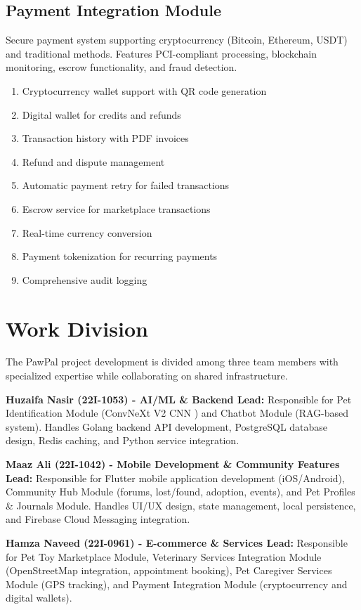 \subsection{Payment Integration Module}

Secure payment system supporting cryptocurrency (Bitcoin, Ethereum, USDT) and traditional methods. Features PCI-compliant processing, blockchain monitoring, escrow functionality, and fraud detection.

\begin{enumerate}
    \item Cryptocurrency wallet support with QR code generation
    \item Digital wallet for credits and refunds
    \item Transaction history with PDF invoices
    \item Refund and dispute management
    \item Automatic payment retry for failed transactions
    \item Escrow service for marketplace transactions
    \item Real-time currency conversion
    \item Payment tokenization for recurring payments
    \item Comprehensive audit logging
\end{enumerate}

\section{Work Division}

The PawPal project development is divided among three team members with specialized expertise while collaborating on shared infrastructure.

\textbf{Huzaifa Nasir (22I-1053) - AI/ML \& Backend Lead:}
Responsible for Pet Identification Module (ConvNeXt V2 CNN ) and Chatbot Module (RAG-based system). Handles Golang backend API development, PostgreSQL database design, Redis caching, and Python service integration.

\textbf{Maaz Ali (22I-1042) - Mobile Development \& Community Features Lead:}
Responsible for Flutter mobile application development (iOS/Android), Community Hub Module (forums, lost/found, adoption, events), and Pet Profiles \& Journals Module. Handles UI/UX design, state management, local persistence, and Firebase Cloud Messaging integration.

\textbf{Hamza Naveed (22I-0961) - E-commerce \& Services Lead:}
Responsible for Pet Toy Marketplace Module, Veterinary Services Integration Module (OpenStreetMap integration, appointment booking), Pet Caregiver Services Module (GPS tracking), and Payment Integration Module (cryptocurrency and digital wallets).

